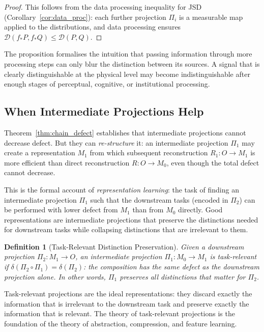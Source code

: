\documentclass[12pt,a4paper]{article}
\newtheorem{definition}[theorem]{Definition}
\theoremstyle{remark}
\theoremstyle{definition}
\begin{document}
\begin{proof}
This follows from the data processing inequality for JSD
(Corollary~\ref{cor:data_proc}): each further projection $\Pi_i$
is a measurable map applied to the distributions, and data processing
ensures $\mathcal{D}(f_*P, f_*Q) \leq \mathcal{D}(P,Q)$.
\end{proof}

The proposition formalises the intuition that passing information through
more processing steps can only blur the distinction between its sources.
A signal that is clearly distinguishable at the physical level may become
indistinguishable after enough stages of perceptual, cognitive, or
institutional processing.

\subsection{When Intermediate Projections Help}

Theorem~\ref{thm:chain_defect} establishes that intermediate projections
cannot decrease defect. But they can \emph{re-structure} it: an
intermediate projection $\Pi_1$ may create a representation $M_1$ from
which subsequent reconstruction $R_1 : O \to M_1$ is more efficient
than direct reconstruction $R : O \to M_0$, even though the total
defect cannot decrease.

This is the formal account of \emph{representation learning}: the task
of finding an intermediate projection $\Pi_1$ such that the downstream
tasks (encoded in $\Pi_2$) can be performed with lower defect from
$M_1$ than from $M_0$ directly. Good representations are intermediate
projections that preserve the distinctions needed for downstream tasks
while collapsing distinctions that are irrelevant to them.

\begin{definition}[Task-Relevant Distinction Preservation]
Given a downstream projection $\Pi_2 : M_1 \to O$, an intermediate
projection $\Pi_1 : M_0 \to M_1$ is \emph{task-relevant} if
$\delta(\Pi_2 \circ \Pi_1) = \delta(\Pi_2)$: the composition has the
same defect as the downstream projection alone. In other words,
$\Pi_1$ preserves all distinctions that matter for $\Pi_2$.
\end{definition}

Task-relevant projections are the ideal representations: they discard
exactly the information that is irrelevant to the downstream task and
preserve exactly the information that is relevant. The theory of
task-relevant projections is the foundation of the theory of abstraction,
compression, and feature learning.
\end{document}
